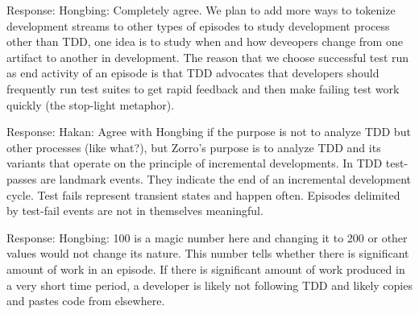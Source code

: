 \documentclass[11pt]{article}
\begin{document}

\noindent Response: Hongbing: Completely agree. We plan to add more ways to tokenize development streams to other types of episodes to study development process 
other than TDD, one idea is to study when and how deveopers change from one artifact to another in development. The reason that we choose successful test run as end activity of an episode is that TDD advocates that developers should frequently run test suites to get rapid feedback and then make failing test work quickly (the stop-light metaphor). 

\noindent Response: Hakan: Agree with Hongbing if the purpose is not to analyze TDD but other processes (like what?), but Zorro's purpose is to analyze TDD and its variants that operate on the principle of incremental developments. In TDD test-passes are landmark events. They indicate the end of an incremental development cycle. Test fails represent transient states and happen often. Episodes delimited by test-fail events are not in themselves meaningful.  


\noindent Response: Hongbing: 100 is a magic number here and changing it to 200 or other values would not change its nature. This number tells whether there is significant amount of work in an episode. If there is significant amount of work produced in a very short time period, a developer is likely not following TDD and likely copies and pastes code from elsewhere. 
\end{document}
